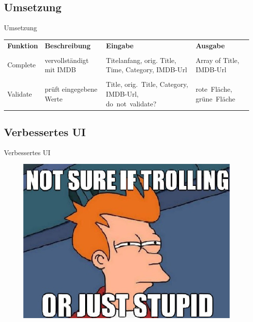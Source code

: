 \documentclass{beamer} %
\begin{document}
	\subsection{Umsetzung}
	\begin{frame}{Umsetzung}
		\small
		\begin{tabular}{p{1.7cm} p{2.6cm} p{2.6cm} p{2.3cm} }
			\textbf{Funktion} & \textbf{Beschreibung} & \textbf{Eingabe} & \textbf{Ausgabe} \pause \\
			\\
			Complete & vervollständigt mit IMDB & Titelanfang, orig. Title, Time, Category, IMDB-Url & Array of {Title, IMDB-Url} \pause \\
			\\
			Validate & prüft eingegebene Werte & Title, orig.~Title, Category, IMDB-Url, do~not~validate? & rote~Fläche, grüne~Fläche \\
		\end{tabular}
	\end{frame}

	\subsection{Verbessertes UI}
	\begin{frame}{Verbessertes UI}
		\begin{figure}[H] 
			\centering
			\includegraphics[width=0.85\linewidth]{uebung10_Soloninov_Dorkenwald}
		\end{figure}
	\end{frame}

	\section{}
	\begin{frame}
	\end{frame}
\end{document}
